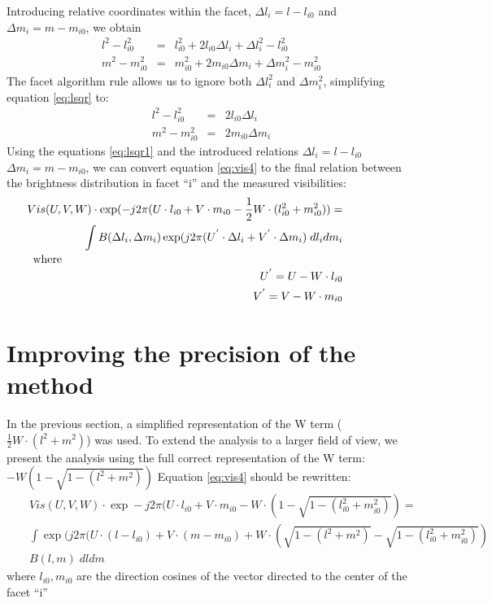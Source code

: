 \documentclass[twoside]{article}
\begin{document}
Introducing relative coordinates within the facet, $\Delta l_i = l -
l_{i0}$ and $\Delta m_i = m - m_{i0}$, we obtain
\begin{eqnarray}
 l^2 - l_{i0}^2 & = & l_{i0}^2+2l_{i0} \Delta l_i + \Delta l_i^2 -
       l_{i0}^2  \nonumber \\
 m^2 - m_{i0}^2 & = & m_{i0}^2+2m_{i0} \Delta m_i + \Delta m_i^2 -
       m_{i0}^2 \label{eq:lsqr}
\end{eqnarray}
The facet algorithm rule allows us to ignore both $\Delta l_i^2$ and
$\Delta m_i^2$, simplifying equation \ref{eq:lsqr} to:
\begin{eqnarray}
 l^2 - l_{i0}^2 & = & 2l_{i0} \Delta l_i  \nonumber \\
 m^2 - m_{i0}^2 & = & 2m_{i0} \Delta m_i \label{eq:lsqr1}
\end{eqnarray}
Using the equations \ref{eq:lsqr1} and the introduced relations
$\Delta l_i = l - l_{i0}$ \hspace{3mm} $ \Delta m_i = m - m_{i0}$, we
can convert equation \ref{eq:vis4} to the final relation between the
brightness distribution in facet ``i'' and the measured visibilities:
\begin{eqnarray}
  & &  Vis(U,V,W) \cdot \exp(-j 2\pi (U \cdot l_{i0} + V \cdot m_{i0}
    - \frac{1}{2} W \cdot (l_{i0}^2 + m_{i0}^2) )   =   \nonumber \\
  & & \int B(\Delta l_i,\Delta m_i) \exp(j 2\pi (U^{'} \cdot \Delta
    l_i + V^{'} \cdot \Delta m_i ) \;  dl_i dm_i  \label{eq:vis5} \\
\noalign{where}
  & & U^{'} = U - W \cdot l_{i0} \nonumber \\
  & & V^{'} = V - W \cdot m_{i0} \nonumber
\end{eqnarray}

\section{Improving the precision of the method}

In the previous section, a simplified representation of the W term ($
\frac{1}{2} W \cdot (l^2 + m^2) $) was used.  To extend the analysis
to a larger field of view, we present the analysis using the full
correct representation of the W term: $ -W (1 - \sqrt{1 - (l^2+m^2)})$
Equation \ref{eq:vis4} should be rewritten:
\begin{eqnarray}
 & & Vis(U,V,W) \cdot  \exp -j 2\pi (U \cdot l_{i0} + V \cdot m_{i0}
     - W \cdot (1- \sqrt{1- (l_{i0}^2 + m_{i0}^2)})  =  \nonumber \\
 & & \int \exp(j 2\pi (U \cdot (l-l_{i0}) + V \cdot (m-m_{i0})
     + W \cdot \left(\sqrt{1- (l^2 + m^2)} -  \sqrt{1- (l_{i0}^2 +
       m_{i0}^2)} \right) \nonumber\\
 & &  B(l, m) \; dl dm   \label{eq:vis31}
\end{eqnarray}
where $l_{i0}, m_{i0}$ are the direction cosines of the vector
directed to the center of the facet ``i''
\end{document}
